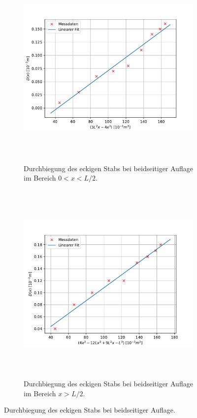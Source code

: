 \begin{figure}[H]
  \begin{subfigure}{\textwidth}
  \centering
  \includegraphics[height=10cm]{content/plots/eckb1.pdf}
  \caption{Durchbiegung des eckigen Stabs bei beidseitiger Auflage im Bereich $0<x<L/2$.}
  \label{fig:LinRegeckb1}
  \end{subfigure}
  \begin{subfigure}{\textwidth}
  \centering
  \includegraphics[height=10cm]{content/plots/eckb2.pdf}
  \caption{Durchbiegung des eckigen Stabs bei beidseitiger Auflage im Bereich $x>L/2$.}
  \label{fig:LinRegeckb2}
  \end{subfigure}
  \caption{Durchbiegung des eckigen Stabs bei beidseitiger Auflage.}
  \label{fig:LinRegeckb}
\end{figure}
